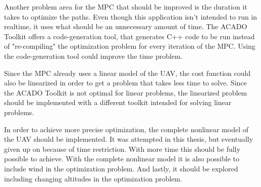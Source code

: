 Another problem area for the MPC that should be improved is the duration it takes to optimize the paths. Even though this application isn't intended to run in realtime, it uses what should be an unnecessary amount of time. The ACADO Toolkit offers a code-generation tool, that generates C++ code to be run instead of "re-compiling" the optimization problem for every iteration of the MPC. Using the code-generation tool could improve the time problem.

Since the MPC already uses a linear model of the UAV, the cost function could also be linearized in order to get a problem that takes less time to solve. Since the ACADO Toolkit is not optimal for linear problems, the linearized problem should be implemented with a different toolkit intended for solving linear problems.

In order to achieve more precise optimization, the complete nonlinear model of the UAV should be implemented. It was attempted in this thesis, but eventually given up on because of time restriction. With more time this should be fully possible to achieve. With the complete nonlinear model it is also possible to include wind in the optimization problem. And lastly, it should be explored including changing altitudes in the optimization problem.